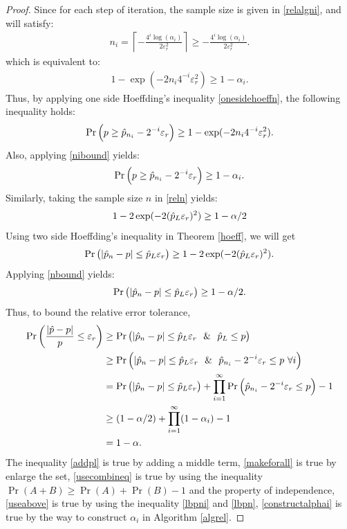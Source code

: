 \documentclass{iitthesis}
\theoremstyle{definition}
\begin{document}
\begin{proof}
Since for each step of iteration, the sample size is given in \eqref{relalgni}, and will satisfy:
\begin{align*}
n_i = \left \lceil -\frac{4^i \log(\alpha_i)} {2\varepsilon_r^2 } \right\rceil \geq -\frac{4^i \log(\alpha_i)} {2\varepsilon_r^2 }.
 \end{align*}
 which is equivalent to:
\begin{align}\label{nibound}
1- \exp(-2n_i4^{-i}\varepsilon_r^2) \geq 1-\alpha_i.
\end{align}
 Thus, by applying one side Hoeffding's inequality \eqref{onesidehoeffn}, the following inequality holds:
 \begin{align*} 
\Pr\left(p \geq \hat{p}_{n_i}-2^{-i}\varepsilon_r  \right) \geq 1- \exp(-2n_i4^{-i}\varepsilon_r^2).
 \end{align*} 
Also, applying \eqref{nibound} yields:
 \begin{align} \label{lbpni}
 \Pr\left(p \geq \hat{p}_{n_i}-2^{-i}\varepsilon_r \right) \geq 1-\alpha_i.
 \end{align}
Similarly, taking the sample size $n$ in \eqref{reln} yields:
\begin{align}\label{nbound}
1-2\exp(-2  (\hat{p}_L\varepsilon_{r})^2) \geq 1-\alpha/2
\end{align}
 Using two side Hoeffding's inequality in Theorem \ref{hoeff}, we will get
\begin{align}
 \Pr \left( \left|{\hat{p}_n - p}\right| \leq \hat{p}_L \varepsilon_r \right ) \geq  1-2\exp(-2  (\hat{p}_L\varepsilon_{r})^2).
 \end{align}
 Applying \eqref{nbound} yields:
 \begin{align}\label{lbpn}
  \Pr \left( \left|{\hat{p}_n - p}\right| \leq \hat{p}_L \varepsilon_r \right ) \geq 1-\alpha/2.
 \end{align}
 Thus, to bound the relative error tolerance,
\begin{align}
 \Pr \left ( \frac{\abs{\hp - p}}{p} \leq \varepsilon_r\right ) & \geq \Pr \left ( \abs{\hp_n - p} \leq \hp_L\varepsilon_r \ \ \& \ \   \hp_L \leq p \right ) \label{addpl}\\&
 \geq \Pr \left( \abs{\hp_n - p} \leq \hp_L \varepsilon_r \ \  \& \ \  \hp_{n_i} - 2^{-i}\varepsilon_r \leq p\  \forall i   \right) \label{makeforall}\\&
  = \Pr\left ( \abs{\hp_n - p} \leq \hp_L \varepsilon_r \right)+ \prod_{i = 1}^\infty \Pr \left(\hp_{n_i} - 2^{-i}\varepsilon_r  \leq p \right)-1\label{usecombineq} \\&
\geq (1-\alpha/2)+\prod_{i=1}^\infty(1-\alpha_i)-1 \label{useabove} \\&
 = 1-\alpha \label{constructalphai}.
\end{align}
The inequality \eqref{addpl} is true by adding a middle term, \eqref{makeforall} is true by enlarge the set, \eqref{usecombineq} is true by using the inequality $\Pr(A+B)\geq\Pr(A)+\Pr(B)-1$ and the property of independence, \eqref{useabove} is true by using the inequality \eqref{lbpni} and \eqref{lbpn}, \eqref{constructalphai} is true by the way to construct $\alpha_i$ in Algorithm \ref{algrel}.
\end{proof}
\end{document}
